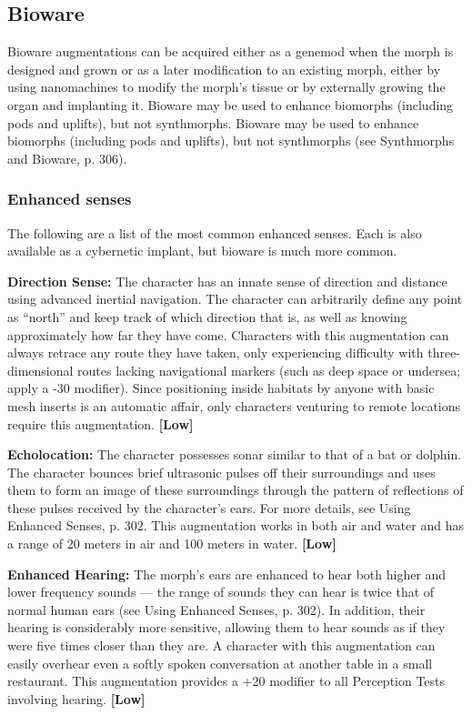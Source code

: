 \subsection{Bioware}
\label{sec:bioware}

Bioware augmentations can be acquired either as a genemod when the morph is designed and grown or as a later modification to an existing morph, either by using nanomachines to modify the morph’s tissue or by externally growing the organ and implanting it. Bioware may be used to enhance biomorphs (including pods and uplifts), but not synthmorphs. Bioware may be used to enhance biomorphs (including pods and uplifts), but not synthmorphs (see Synthmorphs and Bioware, p. 306).

\subsubsection{Enhanced senses}

The following are a list of the most common enhanced senses. Each is also available as a cybernetic implant, but bioware is much more common.

\textbf{Direction Sense:} The character has an innate sense of direction and distance using advanced inertial navigation. The character can arbitrarily define any point as ``north'' and keep track of which direction that is, as well as knowing approximately how far they have come. Characters with this augmentation can always retrace any route they have taken, only experiencing difficulty with three-dimensional routes lacking navigational markers (such as deep space or undersea; apply a -30 modifier). Since positioning inside habitats by anyone with basic mesh inserts is an automatic affair, only characters venturing to remote locations require this augmentation. \textbf{[Low]}

\textbf{Echolocation:} The character possesses sonar similar to that of a bat or dolphin. The character bounces brief ultrasonic pulses off their surroundings and uses them to form an image of these surroundings through the pattern of reflections of these pulses received by the character’s ears. For more details, see Using Enhanced Senses, p. 302. This augmentation works in both air and water and has a range of 20 meters in air and 100 meters in water. \textbf{[Low]}

\textbf{Enhanced Hearing:} The morph’s ears are enhanced to hear both higher and lower frequency sounds --- the range of sounds they can hear is twice that of normal human ears (see Using Enhanced Senses, p. 302). In addition, their hearing is considerably more sensitive, allowing them to hear sounds as if they were five times closer than they are. A character with this augmentation can easily overhear even a softly spoken conversation at another table in a small restaurant. This augmentation provides a +20 modifier to all Perception Tests involving hearing. \textbf{[Low]}

